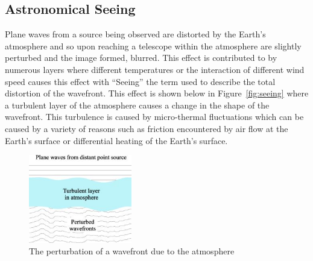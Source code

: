 	\subsection{Astronomical Seeing} %
	\label{sub:astronomical_seeing}
		Plane waves from a source being observed are distorted by the Earth's atmosphere and so upon reaching a telescope within the atmosphere are slightly perturbed and the image formed, blurred. This effect is contributed to by numerous layers where different temperatures or the interaction of different wind speed causes this effect with ``Seeing'' the term used to describe the total distortion of the wavefront\cite[p.~188]{Diffraction_Limited_Imaging_Saha}. This effect is shown below in Figure~\ref{fig:seeing} where a turbulent layer of the atmosphere causes a change in the shape of the wavefront. This turbulence is caused by micro-thermal fluctuations which can be caused by a variety of reasons such as friction encountered by air flow at the Earth's surface or differential heating of the Earth's surface\cite[p.~161]{Diffraction_Limited_Imaging_Saha}.
		\begin{figure}[!htbp]
			\centering
			\includegraphics[width=0.4\textwidth]{../Images/Seeing.png}
			\caption{The perturbation of a wavefront due to the atmosphere\cite{Seeing}\label{fig:Seeing}}
		\end{figure}


